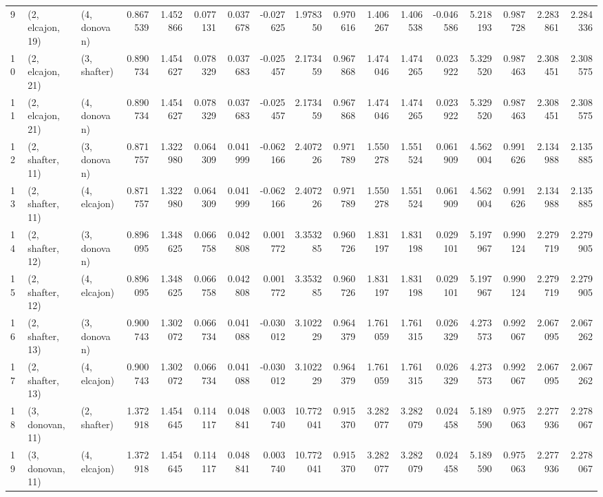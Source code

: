 \begin{tabular}{lllrrrrrrrrrrrrrr}
9  &  (2, elcajon, 19) &     (4, donovan) &  0.867539 &  1.452866 &   0.077131 &  0.037678 & -0.027625 &   1.978350 &  0.970616 &   1.406267 &  1.406538 & -0.046586 &   5.218193 &  0.987728 &  2.283861 &  2.284336 \\
10 &  (2, elcajon, 21) &     (3, shafter) &  0.890734 &  1.454627 &   0.078329 &  0.037683 & -0.025457 &   2.173459 &  0.967868 &   1.474046 &  1.474265 &  0.023922 &   5.329520 &  0.987463 &  2.308451 &  2.308575 \\
11 &  (2, elcajon, 21) &     (4, donovan) &  0.890734 &  1.454627 &   0.078329 &  0.037683 & -0.025457 &   2.173459 &  0.967868 &   1.474046 &  1.474265 &  0.023922 &   5.329520 &  0.987463 &  2.308451 &  2.308575 \\
12 &  (2, shafter, 11) &     (3, donovan) &  0.871757 &  1.322980 &   0.064309 &  0.041999 & -0.062166 &   2.407226 &  0.971789 &   1.550278 &  1.551524 &  0.061909 &   4.562004 &  0.991626 &  2.134988 &  2.135885 \\
13 &  (2, shafter, 11) &     (4, elcajon) &  0.871757 &  1.322980 &   0.064309 &  0.041999 & -0.062166 &   2.407226 &  0.971789 &   1.550278 &  1.551524 &  0.061909 &   4.562004 &  0.991626 &  2.134988 &  2.135885 \\
14 &  (2, shafter, 12) &     (3, donovan) &  0.896095 &  1.348625 &   0.066758 &  0.042808 &  0.001772 &   3.353285 &  0.960726 &   1.831197 &  1.831198 &  0.029101 &   5.197967 &  0.990124 &  2.279719 &  2.279905 \\
15 &  (2, shafter, 12) &     (4, elcajon) &  0.896095 &  1.348625 &   0.066758 &  0.042808 &  0.001772 &   3.353285 &  0.960726 &   1.831197 &  1.831198 &  0.029101 &   5.197967 &  0.990124 &  2.279719 &  2.279905 \\
16 &  (2, shafter, 13) &     (3, donovan) &  0.900743 &  1.302072 &   0.066734 &  0.041088 & -0.030012 &   3.102229 &  0.964379 &   1.761059 &  1.761315 &  0.026329 &   4.273573 &  0.992067 &  2.067095 &  2.067262 \\
17 &  (2, shafter, 13) &     (4, elcajon) &  0.900743 &  1.302072 &   0.066734 &  0.041088 & -0.030012 &   3.102229 &  0.964379 &   1.761059 &  1.761315 &  0.026329 &   4.273573 &  0.992067 &  2.067095 &  2.067262 \\
18 &  (3, donovan, 11) &     (2, shafter) &  1.372918 &  1.454645 &   0.114117 &  0.048841 &  0.003740 &  10.772041 &  0.915370 &   3.282077 &  3.282079 &  0.024458 &   5.189590 &  0.975063 &  2.277936 &  2.278067 \\
19 &  (3, donovan, 11) &     (4, elcajon) &  1.372918 &  1.454645 &   0.114117 &  0.048841 &  0.003740 &  10.772041 &  0.915370 &   3.282077 &  3.282079 &  0.024458 &   5.189590 &  0.975063 &  2.277936 &  2.278067 \\

\end{tabular}
